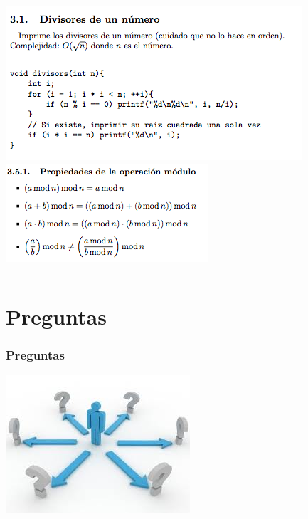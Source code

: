 \documentclass{beamer}
\begin{document}
	\begin{frame}
		\begin{columns}[t]
				\includegraphics[width = \textwidth]{./img/manual2.png}
				\includegraphics[width = \textwidth]{./img/manual3.png}
		\end{columns}
	\end{frame}

\section{Preguntas}
	\begin{frame}
		\frametitle{Preguntas}
		\includegraphics[]{./img/preguntas.jpeg}
	\end{frame}
\end{document}

